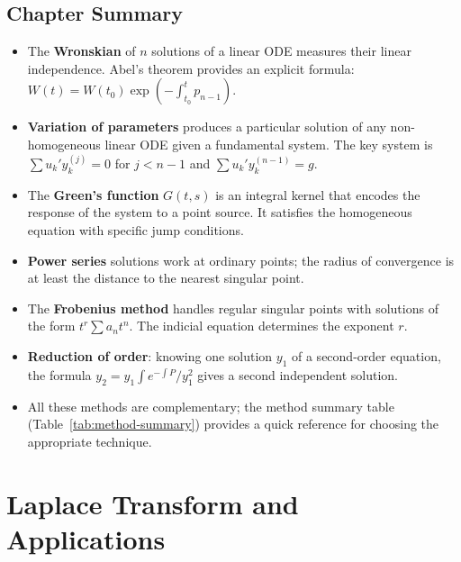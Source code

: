 \documentclass[12pt,a4paper,openany]{book}
\theoremstyle{definition}
\theoremstyle{plain}
\theoremstyle{remark}
\begin{document}
\section{Chapter Summary}\label{sec:methods-summary}

\begin{itemize}
  \item The \textbf{Wronskian} of $n$ solutions of a linear ODE measures
    their linear independence.  Abel's theorem provides an explicit formula:
    $W(t)=W(t_0)\exp(-\int_{t_0}^t p_{n-1})$.
  \item \textbf{Variation of parameters} produces a particular solution of
    any non-homogeneous linear ODE given a fundamental system.  The key
    system is $\sum u_k' y_k^{(j)}=0$ for $j<n-1$ and
    $\sum u_k' y_k^{(n-1)}=g$.
  \item The \textbf{Green's function} $G(t,s)$ is an integral kernel
    that encodes the response of the system to a point source.  It
    satisfies the homogeneous equation with specific jump conditions.
  \item \textbf{Power series} solutions work at ordinary points; the
    radius of convergence is at least the distance to the nearest
    singular point.
  \item The \textbf{Frobenius method} handles regular singular points
    with solutions of the form $t^r\sum a_n t^n$.  The indicial equation
    determines the exponent $r$.
  \item \textbf{Reduction of order}: knowing one solution $y_1$ of a
    second-order equation, the formula
    $y_2=y_1\int e^{-\int P}/y_1^2$ gives a second independent solution.
  \item All these methods are complementary; the method summary table
    (Table~\ref{tab:method-summary}) provides a quick reference for
    choosing the appropriate technique.
\end{itemize}


\chapter{Laplace Transform and Applications}
\label{ch:laplace}
\end{document}
